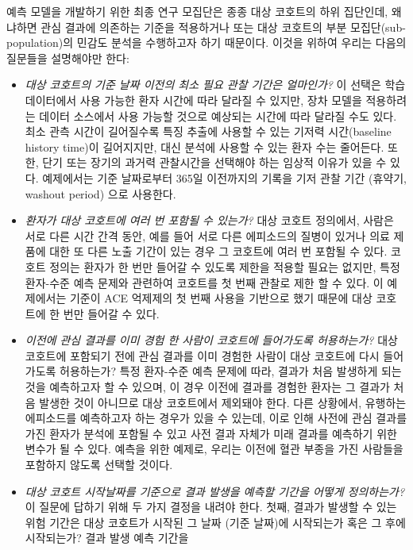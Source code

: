 \documentclass[10.5pt]{book}
\theoremstyle{definition}
\theoremstyle{definition}
\theoremstyle{definition}
\theoremstyle{remark}
\begin{document}
예측 모델을 개발하기 위한 최종 연구 모집단은 종종 대상 코호트의 하위
집단인데, 왜냐하면 관심 결과에 의존하는 기준을 적용하거나 또는 대상
코호트의 부분 모집단(sub-population)의 민감도 분석을 수행하고자 하기
때문이다. 이것을 위하여 우리는 다음의 질문들을 설명해야만 한다:

\begin{itemize}
\item
  \emph{대상 코호트의 기준 날짜 이전의 최소 필요 관찰 기간은 얼마인가?}
  이 선택은 학습 데이터에서 사용 가능한 환자 시간에 따라 달라질 수
  있지만, 장차 모델을 적용하려는 데이터 소스에서 사용 가능할 것으로
  예상되는 시간에 따라 달라질 수도 있다. 최소 관측 시간이 길어질수록
  특징 추출에 사용할 수 있는 기저력 시간(baseline history time)이
  길어지지만, 대신 분석에 사용할 수 있는 환자 수는 줄어든다. 또한, 단기
  또는 장기의 과거력 관찰시간을 선택해야 하는 임상적 이유가 있을 수
  있다. 예제에서는 기준 날짜로부터 365일 이전까지의 기록을 기저 관찰
  기간 (휴약기, washout period) 으로 사용한다.
\item
  \emph{환자가 대상 코호트에 여러 번 포함될 수 있는가?} 대상 코호트
  정의에서, 사람은 서로 다른 시간 간격 동안, 예를 들어 서로 다른
  에피소드의 질병이 있거나 의료 제품에 대한 또 다른 노출 기간이 있는
  경우 그 코호트에 여러 번 포함될 수 있다. 코호트 정의는 환자가 한 번만
  들어갈 수 있도록 제한을 적용할 필요는 없지만, 특정 환자-수준 예측
  문제와 관련하여 코호트를 첫 번째 관찰로 제한 할 수 있다. 이 예제에서는
  기준이 ACE 억제제의 첫 번째 사용을 기반으로 했기 때문에 대상 코호트에
  한 번만 들어갈 수 있다.
\item
  \emph{이전에 관심 결과를 이미 경험 한 사람이 코호트에 들어가도록
  허용하는가?} 대상 코호트에 포함되기 전에 관심 결과를 이미 경험한
  사람이 대상 코호트에 다시 들어가도록 허용하는가? 특정 환자-수준 예측
  문제에 따라, 결과가 처음 발생하게 되는 것을 예측하고자 할 수 있으며,
  이 경우 이전에 결과를 경험한 환자는 그 결과가 처음 발생한 것이
  아니므로 대상 코호트에서 제외돼야 한다. 다른 상황에서, 유행하는
  에피소드를 예측하고자 하는 경우가 있을 수 있는데, 이로 인해 사전에
  관심 결과를 가진 환자가 분석에 포함될 수 있고 사전 결과 자체가 미래
  결과를 예측하기 위한 변수가 될 수 있다. 예측을 위한 예제로, 우리는
  이전에 혈관 부종을 가진 사람들을 포함하지 않도록 선택할 것이다.
\item
  \emph{대상 코호트 시작날짜를 기준으로 결과 발생을 예측할 기간을 어떻게
  정의하는가?} 이 질문에 답하기 위해 두 가지 결정을 내려야 한다. 첫째,
  결과가 발생할 수 있는 위험 기간은 대상 코호트가 시작된 그 날짜 (기준
  날짜)에 시작되는가 혹은 그 후에 시작되는가? 결과 발생 예측 기간을

\end{itemize}
\end{document}
